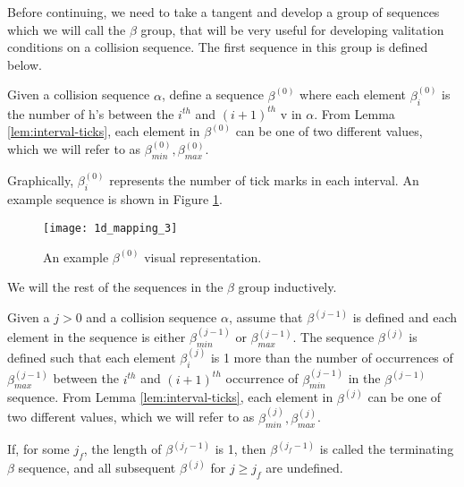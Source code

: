 
Before continuing, we need to take a tangent and develop a group of sequences which we will call the $\beta$ group, that will be very useful for developing valitation conditions on a collision sequence. The first sequence in this group is defined below.

\begin{definition}
	Given a collision sequence $\alpha$, define a sequence $\beta^{(0)}$ where each element $\beta^{(0)}_i$ is the number of h's between the $i^{th}$ and $(i+1)^{th}$ v in $\alpha$. From Lemma \ref{lem:interval-ticks}, each element in $\beta^{(0)}$ can be one of two different values, which we will refer to as $\beta^{(0)}_{min}, \beta^{(0)}_{max}$.
\end{definition}

Graphically, $\beta^{(0)}_i$ represents the number of tick marks in each interval. An example sequence is shown in Figure \ref{fig:beta-sequence}.

\begin{figure}[H]
  \begin{center}
    \texttt{[image: 1d\_mapping\_3]}
  \end{center}
  \vspace{-.2in} %
  \caption{\label{fig:beta-sequence} An example $\beta^{(0)}$ visual representation.}
\end{figure}

We will the rest of the sequences in the $\beta$ group inductively.

\begin{definition}
  \label{def:beta-definition}
  Given a $j > 0$ and a collision sequence $\alpha$, assume that $\beta^{(j-1)}$ is defined and each element in the sequence is either $\beta^{(j-1)}_{min}$ or $\beta^{(j-1)}_{max}$. The sequence $\beta^{(j)}$ is defined such that each element $\beta^{(j)}_i$ is 1 more than the number of occurrences of $\beta^{(j-1)}_{max}$ between the $i^{th}$ and $(i+1)^{th}$ occurrence of $\beta^{(j-1)}_{min}$ in the $\beta^{(j-1)}$ sequence. From Lemma \ref{lem:interval-ticks}, each element in $\beta^{(j)}$ can be one of two different values, which we will refer to as $\beta^{(j)}_{min}, \beta^{(j)}_{max}$.

	If, for some $j_f$, the length of $\beta^{(j_f-1)}$ is 1, then $\beta^{(j_f-1)}$ is called the terminating $\beta$ sequence, and all subsequent $\beta^{(j)}$ for $j \ge j_f$ are undefined.
\end{definition}

